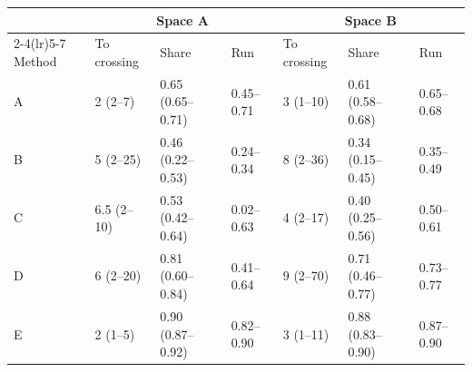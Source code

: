 \begin{tabular}{lllllll}\toprule
 & \multicolumn{3}{c}{Space A} & \multicolumn{3}{c}{Space B}\\\cmidrule(lr){2-4}\cmidrule(lr){5-7}
Method & To crossing & Share & Run & To crossing & Share & Run\\\midrule
A & 2 (2--7) & 0.65 (0.65--0.71) & 0.45--0.71 & 3 (1--10) & 0.61 (0.58--0.68) & 0.65--0.68\\
B & 5 (2--25) & 0.46 (0.22--0.53) & 0.24--0.34 & 8 (2--36) & 0.34 (0.15--0.45) & 0.35--0.49\\
C & 6.5 (2--10) & 0.53 (0.42--0.64) & 0.02--0.63 & 4 (2--17) & 0.40 (0.25--0.56) & 0.50--0.61\\
D & 6 (2--20) & 0.81 (0.60--0.84) & 0.41--0.64 & 9 (2--70) & 0.71 (0.46--0.77) & 0.73--0.77\\
E & 2 (1--5) & 0.90 (0.87--0.92) & 0.82--0.90 & 3 (1--11) & 0.88 (0.83--0.90) & 0.87--0.90\\
\bottomrule\end{tabular}
